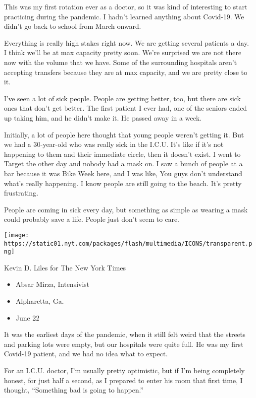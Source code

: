 This was my first rotation ever as a doctor, so it was kind of
interesting to start practicing during the pandemic. I hadn't learned
anything about Covid-19. We didn't go back to school from March onward.

Everything is really high stakes right now. We are getting several
patients a day. I think we'll be at max capacity pretty soon. We're
surprised we are not there now with the volume that we have. Some of the
surrounding hospitals aren't accepting transfers because they are at max
capacity, and we are pretty close to it.

I've seen a lot of sick people. People are getting better, too, but
there are sick ones that don't get better. The first patient I ever had,
one of the seniors ended up taking him, and he didn't make it. He passed
away in a week.

Initially, a lot of people here thought that young people weren't
getting it. But we had a 30-year-old who was really sick in the I.C.U.
It's like if it's not happening to them and their immediate circle, then
it doesn't exist. I went to Target the other day and nobody had a mask
on. I saw a bunch of people at a bar because it was Bike Week here, and
I was like, You guys don't understand what's really happening. I know
people are still going to the beach. It's pretty frustrating.

People are coming in sick every day, but something as simple as wearing
a mask could probably save a life. People just don't seem to care.

\texttt{[image: https://static01.nyt.com/packages/flash/multimedia/ICONS/transparent.png]}

Kevin D. Liles for The New York Times

\begin{itemize}
\tightlist
\item
  Absar Mirza, Intensivist
\item
  Alpharetta, Ga.
\item
  June 22
\end{itemize}

It was the earliest days of the pandemic, when it still felt weird that
the streets and parking lots were empty, but our hospitals were quite
full. He was my first Covid-19 patient, and we had no idea what to
expect.

For an I.C.U. doctor, I'm usually pretty optimistic, but if I'm being
completely honest, for just half a second, as I prepared to enter his
room that first time, I thought, ``Something bad is going to happen.''

